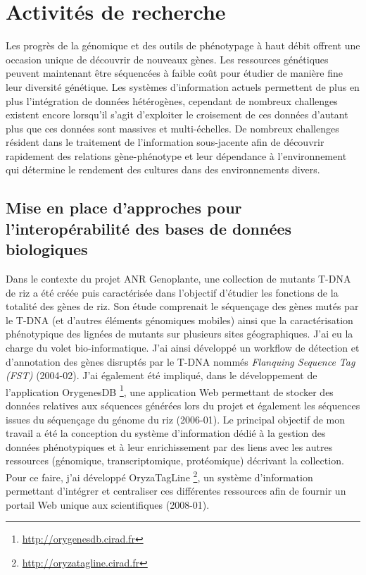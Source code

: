 \section{Activités de recherche}

Les progrès de la génomique et des outils de phénotypage à haut débit offrent une occasion unique de découvrir de nouveaux gènes. Les ressources génétiques peuvent maintenant être séquencées à faible coût pour étudier de manière fine leur diversité génétique. Les systèmes d'information actuels permettent de plus en plus l'intégration de données hétérogènes, cependant de nombreux challenges existent encore lorsqu'il s'agit d'exploiter le croisement de ces données d'autant plus que ces données sont massives et multi-échelles. De nombreux challenges résident dans le traitement de l'information sous-jacente afin de découvrir rapidement des relations gène-phénotype et leur dépendance à l’environnement qui détermine le rendement des cultures dans des environnements divers.

\subsection*{Mise en place d’approches pour l’interopérabilité des bases de données biologiques}\label{these}

Dans le contexte du projet ANR Genoplante, une collection de mutants T-DNA de riz a été créée puis caractérisée dans l'objectif d'étudier les fonctions de la totalité des gènes de riz. Son étude comprenait le séquençage des gènes mutés par le T-DNA (et d'autres éléments génomiques mobiles) ainsi que la caractérisation phénotypique des lignées de mutants sur plusieurs sites géographiques. J'ai eu la charge du volet bio-informatique. J'ai ainsi développé un workflow de détection et d'annotation des  gènes disruptés par le T-DNA nommés \textit{Flanquing Sequence Tag (FST)}  (2004-02). J'ai également été impliqué, dans le développement de l'application OrygenesDB \footnote{\url{http://orygenesdb.cirad.fr}}, une application Web permettant de stocker des données relatives aux séquences générées lors du projet et également les séquences issues du séquençage du génome du riz (2006-01). Le principal objectif de mon travail a été la conception du système d'information dédié à la gestion des données phénotypiques et à leur enrichissement par des liens avec les autres ressources (génomique, transcriptomique, protéomique) décrivant la collection. Pour ce faire, j’ai développé OryzaTagLine \footnote{\url{http://oryzatagline.cirad.fr}}, un système d’information permettant d’intégrer et centraliser ces différentes ressources afin de fournir un portail Web unique aux scientifiques (2008-01).\\

